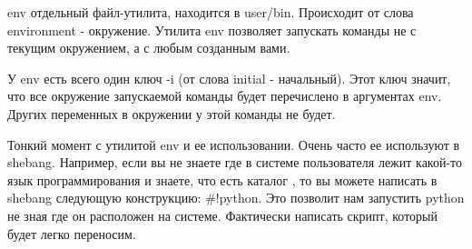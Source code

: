 \begin{defi}{env}
	отдельный файл-утилита, находится в user/bin. Происходит от слова environment - окружение. Утилита env позволяет запускать команды не с текущим окружением, а с любым созданным вами.
\end{defi}

У env есть всего один ключ -i (от слова initial - начальный). Этот ключ значит, что все окружение запускаемой команды будет перечислено в аргументах env. Других переменных в окружении у этой команды не будет.

Тонкий момент с утилитой env и ее использовании. Очень часто ее используют в shebang. Например, если вы не знаете где в системе пользователя лежит какой-то язык программирования и знаете, что есть каталог \user\bin\env, то вы можете написать в shebang следующую конструкцию: #!\usr\bin\env python. Это позволит нам запустить python не зная где он расположен на системе. Фактически написать скрипт, который будет легко переносим.